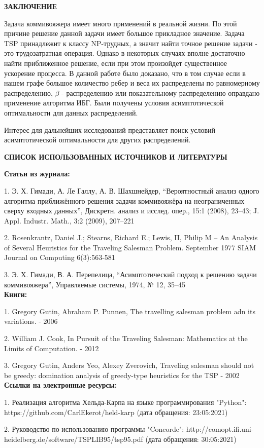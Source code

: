 \documentclass[a4paper, 14pt]{extarticle}
\begin{document}
\newpage

\begin{center}
 \textbf{ЗАКЛЮЧЕНИЕ}
\end{center}

Задача коммивояжера имеет много применений в реальной жизни. По этой причине решение данной задачи имеет большое прикладное значение. Задача TSP принадлежит к классу NP-трудных, а значит найти точное решение задачи - это трудозатратная операция. Однако в некоторых случаях вполне достаточно найти приближенное решение, если при этом произойдет существенное ускорение процесса. В данной работе было доказано, что в том случае если в нашем графе большое количество ребер и веса их распределены по равномерному распределению, $\beta$ - распределению или показательному распределению оправдано применение алгоритма ИБГ. Были получены условия асимптотической оптимальности для данных распределений.

Интерес для дальнейших исследований представляет поиск условий асимптотической оптимальности для других распределений.





\newpage

\begin{center}
 \textbf{СПИСОК ИСПОЛЬЗОВАННЫХ ИСТОЧНИКОВ И ЛИТЕРАТУРЫ }
\end{center}

\textbf{Статьи из журнала:}

1. 	Э. Х. Гимади, А. Ле Галлу, А. В. Шахшнейдер, “Вероятностный анализ одного алгоритма приближённого решения задачи коммивояжёра на неограниченных сверху входных данных”, Дискретн. анализ и исслед. опер., 15:1 (2008), 23–43; J. Appl. Industr. Math., 3:2 (2009), 207–221

2. Rosenkrantz, Daniel J.; Stearns, Richard E.; Lewis, II, Philip M -- An Analysis of Several Heuristics for the Traveling Salesman Problem. September 1977 SIAM Journal on Computing 6(3):563-581

3. 	Э. Х. Гимади, В. А. Перепелица, “Асимптотический подход к решению задачи коммивояжера”, Управляемые системы, 1974, № 12, 35–45\\


\textbf{Книги:}

1. Gregory Gutin, Abraham P. Punnen, The travelling salesman problem adn its variations. - 2006

2. William J. Cook, In Pursuit of the Traveling Salesman: Mathematics at the Limits of Computation. - 2012

3. Gregory Gutin, Anders Yeo, Alexey Zverovich, Traveling salesman should not be greedy: domination analysis of greedy-type heuristics for the TSP - 2002\\

\textbf{Ссылки на электронные ресурсы:}

1. Реализация алгоритма Хельда-Карпа на языке программирования "Python": https://github.com/CarlEkerot/held-karp (дата обращения: 23:05:2021)

2. Руководство по использованию программы "Concorde": http://comopt.ifi.uni-heidelberg.de/software/TSPLIB95/tsp95.pdf (дата обращения: 30:05:2021)
\end{document}
